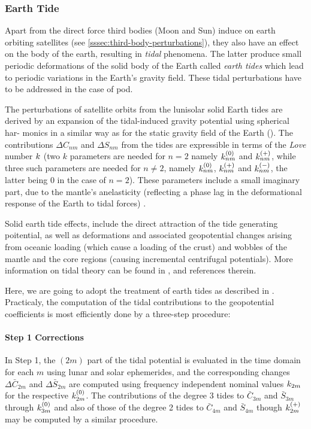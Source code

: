 \subsubsection{Earth Tide}\label{sssec:earth-tide-perturbations}

Apart from the direct force third bodies (Moon and Sun) induce on earth orbiting 
satellites (see \ref{sssec:third-body-perturbations}), they also have an effect on 
the body of the earth, resulting in \emph{tidal} phenomena. The latter produce 
small periodic deformations of the solid body of the Earth called \emph{earth tides} 
which lead to periodic variations in the Earth's gravity field. These tidal perturbations 
have to be addressed in the case of \gls{pod}.

The perturbations of satellite orbits from the lunisolar solid Earth tides are
derived by an expansion of the tidal-induced gravity potential using spherical har-
monics in a similar way as for the static gravity field of the Earth (\cite{Montenbruck2000}).
The contributions $\Delta C_{nm}$ and $\Delta S_{nm}$ from the tides are expressible 
in terms of the \emph{Love} number $k$ (two $k$ parameters are needed for 
$n=2$ namely $k ^{(0)}_{nm}$ and $k ^{(+)}_{nm}$, while three such parameters 
are needed for $n \ne 2$, namely $k ^{(0)}_{nm}$, $k ^{(+)}_{nm}$ and 
$k ^{(-)}_{nm}$, the latter being $0$ in the case of $n=2$). These parameters include 
a small imaginary part, due to the mantle's anelasticity (reflecting a
phase lag in the deformational response of the Earth to tidal forces) \cite{iers2010}.

Solid earth tide effects, include the direct attraction of the tide generating poitential, 
as well as deformations and associated geopotential changes arising from oceanic loading 
(which cause a loading of the crust) and wobbles of the mantle and the core regions 
(causing incremental centrifugal potentials). More information on tidal theory can 
be found in \cite{Wilhelm1997}, \cite{iers2010} and references therein.

Here, we are going to adopt the treatment of earth tides as described in 
\cite{iers2010}. Practicaly, the computation of the tidal contributions to the 
geopotential coefficients is most efficiently done by a three-step procedure:
 
\paragraph{Step 1 Corrections}\label{par:step1-corr-earth-tides}
In Step 1, the $(2m)$ part of the tidal potential is evaluated in the 
time domain for each $m$ using lunar and solar ephemerides, and the 
corresponding changes $\Delta \bar{C}_{2m}$ and $\Delta \bar{S}_{2m}$ are 
computed using frequency independent nominal values $k _{2m}$ for the 
respective $k ^{(0)}_{2m}$. The contributions of the degree 3 tides to
$\bar{C}_{3m}$ and $\bar{S}_{3m}$ through $k ^{(0)}_{3m}$ and also of 
those of the degree 2 tides to $\bar{C}_{4m}$ and $\bar{S}_{4m}$ though 
$k ^{(+)}_{2m}$ may be computed by a similar procedure.

